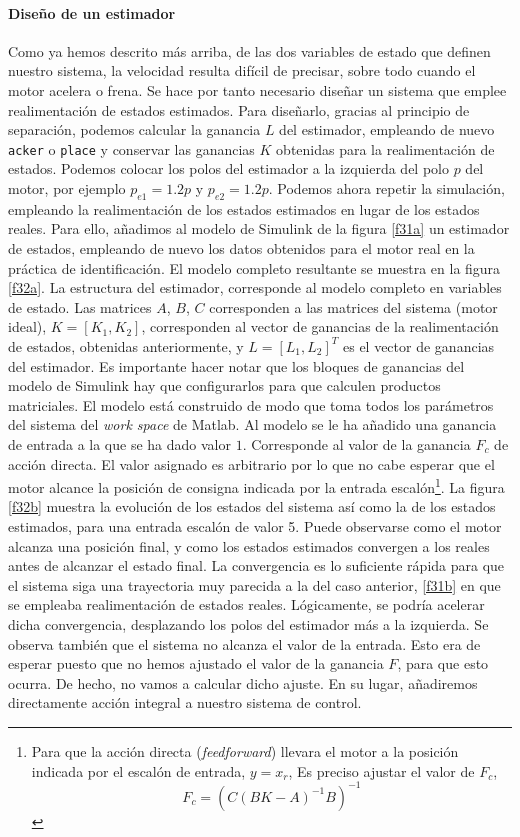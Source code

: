 \documentclass[10pt,a4paper]{report}
\begin{document}
\paragraph{Diseño de un  estimador} Como ya hemos descrito más arriba, de las dos variables de estado que definen nuestro sistema, la velocidad resulta difícil de precisar, sobre todo cuando el motor acelera o frena. Se hace por tanto necesario diseñar un sistema que emplee realimentación de estados estimados. Para diseñarlo, gracias al principio de separación, podemos calcular la ganancia $L$ del estimador, empleando de nuevo  \texttt{acker} o \texttt{place} y conservar las ganancias $K$ obtenidas para la realimentación de estados. Podemos colocar los polos del estimador a la izquierda del polo $p$ del motor, por ejemplo $p_{e1} = 1.2p$ y $p_{e2} = 1.2p $. Podemos ahora repetir la simulación, empleando la realimentación de los estados estimados en lugar de los estados reales. Para ello, añadimos al modelo de Simulink de la figura \ref{f31a} un estimador de estados, empleando de nuevo los datos obtenidos para el motor real en la práctica de identificación. El modelo completo resultante se muestra en la figura \ref{f32a}. La estructura del estimador, corresponde al modelo completo en variables de estado. Las matrices $A$, $B$, $C$ corresponden a las matrices del sistema (motor ideal), $K = [K_1,K_2]$, corresponden al vector de ganancias de la realimentación de estados, obtenidas anteriormente, y $L = [L_1,L_2]^T$ es el vector de ganancias del estimador. Es importante hacer notar que los bloques de ganancias del modelo de Simulink hay que configurarlos para que calculen productos matriciales. El modelo está construido de modo que toma todos los parámetros del sistema del \emph{work space} de Matlab. Al modelo se le ha añadido una ganancia de entrada a la que se ha dado valor $1$. Corresponde al valor de la ganancia $F_c$ de acción directa. El valor asignado es arbitrario por lo que no cabe esperar que el motor alcance la posición de consigna indicada por la entrada escalón\footnote{Para que la acción directa (\emph{{feedforward}}) llevara el motor a la posición indicada por el escalón de entrada, $y = x_r$, Es preciso ajustar el valor de $F_c$,
\begin{equation}
	F_c = (C(BK-A)^{-1}B)^{-1}
\end{equation}  
}.
La figura \ref{f32b} muestra la evolución de los estados del sistema así como la de los estados estimados, para una entrada escalón de valor 5. Puede observarse como el motor alcanza una posición final, y como los estados estimados convergen a  los reales antes de alcanzar el estado final. La convergencia es lo suficiente rápida para que el sistema siga una trayectoria muy parecida a la del caso anterior, \ref{f31b} en que se empleaba realimentación de estados reales. Lógicamente, se podría acelerar dicha convergencia, desplazando los polos del estimador más a la izquierda. Se observa también que el sistema no alcanza el valor de la entrada. Esto era de esperar puesto que no hemos ajustado el valor de la ganancia $F$, para que esto ocurra. De hecho, no vamos a calcular dicho ajuste. En su lugar, añadiremos directamente acción integral a nuestro sistema de control.
\end{document}
